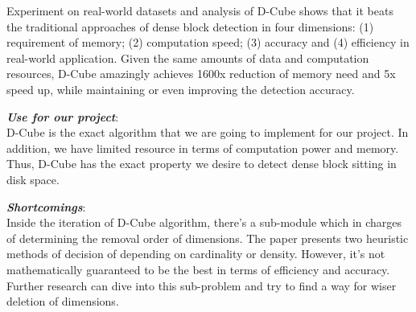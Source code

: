 \begin{itemize*}
Experiment on real-world datasets and analysis of D-Cube shows that it beats the traditional approaches of dense block detection in four dimensions: (1) requirement of memory; (2) computation speed; (3) accuracy and (4) efficiency in real-world application. Given the same amounts of data and computation resources, D-Cube amazingly achieves 1600x reduction of memory need and 5x speed up, while maintaining or even improving the detection accuracy. \\ 

\item {\em \textbf{Use for our project}}: \\
D-Cube is the exact algorithm that we are going to implement for our project. In addition, we have limited resource in terms of computation power and memory. Thus, D-Cube has the exact property we desire to detect dense block sitting in disk space. \\ 

\item {\em \textbf{Shortcomings}}:\\
Inside the iteration of D-Cube algorithm, there’s a sub-module which in charges of determining the removal order of dimensions. The paper presents two heuristic methods of decision of depending on cardinality or density. However, it’s not mathematically guaranteed to be the best in terms of efficiency and accuracy. Further research can dive into this sub-problem and try to find a way for wiser deletion of dimensions. 
\end{itemize*}

